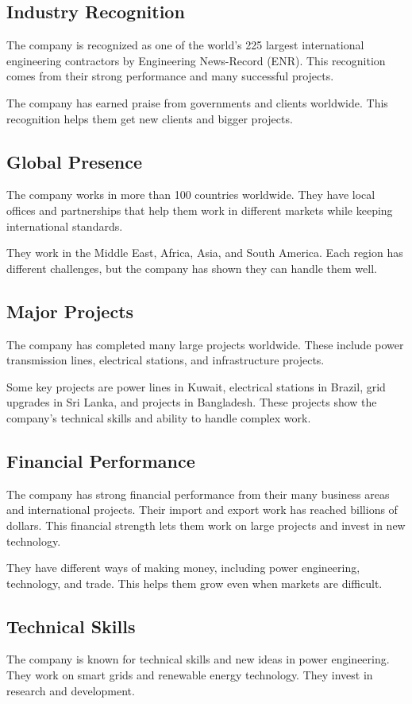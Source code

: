 \subsection{Industry Recognition}
The company is recognized as one of the world's 225 largest international engineering contractors by Engineering News-Record (ENR). This recognition comes from their strong performance and many successful projects.

The company has earned praise from governments and clients worldwide. This recognition helps them get new clients and bigger projects.

\subsection{Global Presence}
The company works in more than 100 countries worldwide. They have local offices and partnerships that help them work in different markets while keeping international standards.

They work in the Middle East, Africa, Asia, and South America. Each region has different challenges, but the company has shown they can handle them well.

\subsection{Major Projects}
The company has completed many large projects worldwide. These include power transmission lines, electrical stations, and infrastructure projects.

Some key projects are power lines in Kuwait, electrical stations in Brazil, grid upgrades in Sri Lanka, and projects in Bangladesh. These projects show the company's technical skills and ability to handle complex work.

\subsection{Financial Performance}
The company has strong financial performance from their many business areas and international projects. Their import and export work has reached billions of dollars. This financial strength lets them work on large projects and invest in new technology.

They have different ways of making money, including power engineering, technology, and trade. This helps them grow even when markets are difficult.

\subsection{Technical Skills}
The company is known for technical skills and new ideas in power engineering. They work on smart grids and renewable energy technology. They invest in research and development.

